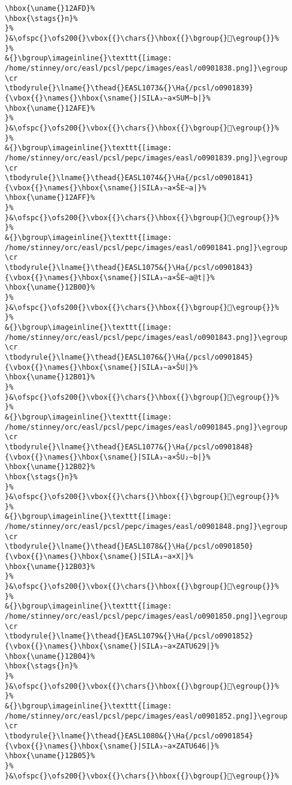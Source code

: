 \begin{verbatim}
\hbox{\uname{}12AFD}%
\hbox{\stags{}n}%
}%
}&\ofspc{}\ofs200{}\vbox{{}\chars{}\hbox{{}\bgroup{}𒫽\egroup{}}%
}%
&{}\bgroup\imageinline{}\texttt{[image: /home/stinney/orc/easl/pcsl/pepc/images/easl/o0901838.png]}\egroup
\cr
\tbodyrule{}\lname{}\thead{}EASL1073&{}\Ha{/pcsl/o0901839}{\vbox{{}\names{}\hbox{\sname{}|SILA₃∼a×SUM∼b|}%
\hbox{\uname{}12AFE}%
}%
}&\ofspc{}\ofs200{}\vbox{{}\chars{}\hbox{{}\bgroup{}𒫾\egroup{}}%
}%
&{}\bgroup\imageinline{}\texttt{[image: /home/stinney/orc/easl/pcsl/pepc/images/easl/o0901839.png]}\egroup
\cr
\tbodyrule{}\lname{}\thead{}EASL1074&{}\Ha{/pcsl/o0901841}{\vbox{{}\names{}\hbox{\sname{}|SILA₃∼a×ŠE∼a|}%
\hbox{\uname{}12AFF}%
}%
}&\ofspc{}\ofs200{}\vbox{{}\chars{}\hbox{{}\bgroup{}𒫿\egroup{}}%
}%
&{}\bgroup\imageinline{}\texttt{[image: /home/stinney/orc/easl/pcsl/pepc/images/easl/o0901841.png]}\egroup
\cr
\tbodyrule{}\lname{}\thead{}EASL1075&{}\Ha{/pcsl/o0901843}{\vbox{{}\names{}\hbox{\sname{}|SILA₃∼a×ŠE∼a@t|}%
\hbox{\uname{}12B00}%
}%
}&\ofspc{}\ofs200{}\vbox{{}\chars{}\hbox{{}\bgroup{}𒬀\egroup{}}%
}%
&{}\bgroup\imageinline{}\texttt{[image: /home/stinney/orc/easl/pcsl/pepc/images/easl/o0901843.png]}\egroup
\cr
\tbodyrule{}\lname{}\thead{}EASL1076&{}\Ha{/pcsl/o0901845}{\vbox{{}\names{}\hbox{\sname{}|SILA₃∼a×ŠU|}%
\hbox{\uname{}12B01}%
}%
}&\ofspc{}\ofs200{}\vbox{{}\chars{}\hbox{{}\bgroup{}𒬁\egroup{}}%
}%
&{}\bgroup\imageinline{}\texttt{[image: /home/stinney/orc/easl/pcsl/pepc/images/easl/o0901845.png]}\egroup
\cr
\tbodyrule{}\lname{}\thead{}EASL1077&{}\Ha{/pcsl/o0901848}{\vbox{{}\names{}\hbox{\sname{}|SILA₃∼a×ŠU₂∼b|}%
\hbox{\uname{}12B02}%
\hbox{\stags{}n}%
}%
}&\ofspc{}\ofs200{}\vbox{{}\chars{}\hbox{{}\bgroup{}𒬂\egroup{}}%
}%
&{}\bgroup\imageinline{}\texttt{[image: /home/stinney/orc/easl/pcsl/pepc/images/easl/o0901848.png]}\egroup
\cr
\tbodyrule{}\lname{}\thead{}EASL1078&{}\Ha{/pcsl/o0901850}{\vbox{{}\names{}\hbox{\sname{}|SILA₃∼a×X|}%
\hbox{\uname{}12B03}%
}%
}&\ofspc{}\ofs200{}\vbox{{}\chars{}\hbox{{}\bgroup{}𒬃\egroup{}}%
}%
&{}\bgroup\imageinline{}\texttt{[image: /home/stinney/orc/easl/pcsl/pepc/images/easl/o0901850.png]}\egroup
\cr
\tbodyrule{}\lname{}\thead{}EASL1079&{}\Ha{/pcsl/o0901852}{\vbox{{}\names{}\hbox{\sname{}|SILA₃∼a×ZATU629|}%
\hbox{\uname{}12B04}%
\hbox{\stags{}n}%
}%
}&\ofspc{}\ofs200{}\vbox{{}\chars{}\hbox{{}\bgroup{}𒬄\egroup{}}%
}%
&{}\bgroup\imageinline{}\texttt{[image: /home/stinney/orc/easl/pcsl/pepc/images/easl/o0901852.png]}\egroup
\cr
\tbodyrule{}\lname{}\thead{}EASL1080&{}\Ha{/pcsl/o0901854}{\vbox{{}\names{}\hbox{\sname{}|SILA₃∼a×ZATU646|}%
\hbox{\uname{}12B05}%
}%
}&\ofspc{}\ofs200{}\vbox{{}\chars{}\hbox{{}\bgroup{}𒬅\egroup{}}%

\end{verbatim}
